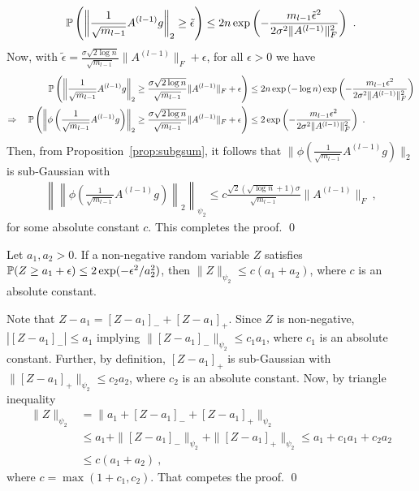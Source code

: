 \begin{align*}
\P \left( \left\| \frac{1}{\sqrt{m_{l-1}}} A^{(l-1)} g \right\|_2 \geq \tilde{\epsilon} \right) \leq 2n \exp\left( - \frac{m_{l-1} \tilde{\epsilon}^2}{2\sigma^2 \| A^{(l-1)} \|^2_F } \right) ~.
\end{align*}
Now, with $\tilde{\epsilon} = \frac{\sigma \sqrt{2 \log n} }{\sqrt{m_{l-1}}} \| A^{(l-1)} \|_F + \epsilon $, for all $\epsilon > 0$ we have
\begin{align*}
\P \left( \left\| \frac{1}{\sqrt{m_{l-1}}} A^{(l-1)} g \right\|_2  \geq  \frac{\sigma \sqrt{2 \log n}}{\sqrt{m_{l-1}}} \| A^{(l-1)} \|_F + \epsilon  \right) & \leq 2n \exp \left( - \log n \right)  \exp\left( - \frac{m_{l-1} \epsilon^2}{2\sigma^2 \| A^{(l-1)} \|^2_F } \right) \\
\Rightarrow ~~~\P \left( \left\| \phi\left( \frac{1}{\sqrt{m_{l-1}}} A^{(l-1)} g \right) \right\|_2  \geq  \frac{\sigma \sqrt{2 \log n }}{\sqrt{m_{l-1}}} \| A^{(l-1)} \|_F + \epsilon  \right) & \leq 2 \exp\left( - \frac{m_{l-1} \epsilon^2}{2\sigma^2 \| A^{(l-1)} \|^2_F } \right)~.
\end{align*}
Then, from Proposition~\ref{prop:subgsum}, it follows that $\| \phi( \frac{1}{\sqrt{m_{l-1}}} A^{(l-1)} g ) \|_2$ is sub-Gaussian with 
\begin{align*}
\left\| \left\| \phi\left( \frac{1}{\sqrt{m_{l-1}}} A^{(l-1)} g \right) \right\|_2 \right\|_{\psi_2} \leq c \frac{\sqrt{2} (\sqrt{\log n} + 1)\sigma}{\sqrt{m_{l-1}}} \| A^{(l-1)} \|_F~,
\end{align*}
for some absolute constant $c$. This completes the proof. \qed 

\begin{prop}
Let $a_1, a_2 > 0$. If a non-negative random variable $Z$ satisfies $\P( Z \geq a_1 + \epsilon) \leq 2 \exp(-\epsilon^2/a_2^2)$, then $\| Z \|_{\psi_2} \leq c(a_1 + a_2)$, where $c$ is an absolute constant.
\label{prop:subgsum}
\end{prop}
\proof Note that $Z-a_1 = [Z-a_1]_- + [Z-a_1]_+$. Since $Z$ is non-negative, $|[Z-a_1]_-| \leq a_1$ implying $\|[Z-a_1]_-\|_{\psi_2} \leq c_1 a_1$, where $c_1$ is an absolute constant. Further, by definition, $[Z-a_1]_+$ is sub-Gaussian with $\| [Z-a_1]_+ \|_{\psi_2} \leq c_2 a_2$, where $c_2$ is an absolute constant. Now, by triangle inequality
\begin{align*}
\| Z \|_{\psi_2} & = \| a_1 + [Z-a_1]_- + [Z - a_1]_+ \|_{\psi_2} \\
& \leq a_1 + \|[Z-a_1]_-\|_{\psi_2} + \| [Z-a_1]_+ \|_{\psi_2} \leq a_1 + c_1 a_1 + c_2 a_2\\
& \leq c(a_1+a_2)~,
\end{align*}
where $c = \max(1+c_1, c_2)$. That competes the proof. \qed

